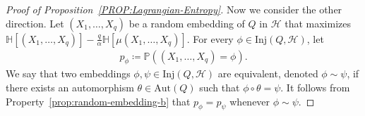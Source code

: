 \documentclass[10pt,a4paper]{amsart}
\begin{document}
\begin{proof}[Proof of Proposition~\ref{PROP:Lagrangian-Entropy}]
    Now we consider the other direction. 
    Let $(X_1, \ldots, X_{q})$ be a random embedding of $Q$ in $\mathcal{H}$ that maximizes $\mathbb{H}[(X_1, \ldots, X_{q})] - \frac{q}{\alpha} \mathbb{H}[\mu(X_1, \ldots, X_q)]$. 
    For every $\phi \in \mathrm{Inj}(Q, \mathcal{H})$, let 
    \begin{align*}
        p_{\phi}
        \coloneqq \mathbb{P}\left((X_1, \ldots, X_q) = \phi \right). 
    \end{align*}
    We say that two embeddings $\phi, \psi \in \mathrm{Inj}(Q,\mathcal{H})$ are equivalent, denoted $\phi \sim \psi$, if there exists an automorphism $\theta \in \mathrm{Aut}(Q)$ such that $\phi \circ \theta = \psi$. 
    It follows from Property~\ref{prop:random-embedding-b} that $p_{\phi} = p_{\psi}$ whenever $\phi\sim \psi$. 
    

\end{proof}
\end{document}
